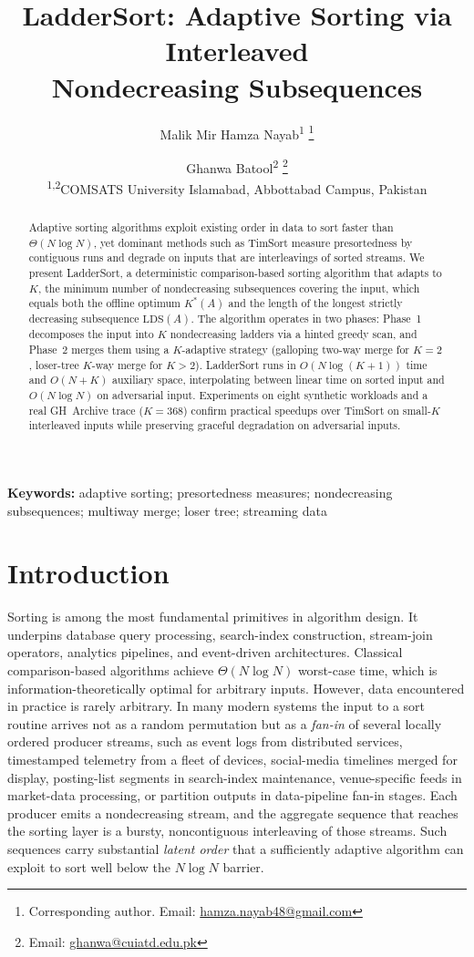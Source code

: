 \documentclass[12pt,a4paper]{article}
\title{LadderSort: Adaptive Sorting via Interleaved\\Nondecreasing Subsequences}
\author{%
  Malik Mir Hamza Nayab\textsuperscript{1}%
  \thanks{Corresponding author. Email:
    \href{mailto:hamza.nayab48@gmail.com}{hamza.nayab48@gmail.com}}
  \and
  Ghanwa Batool\textsuperscript{2}%
  \thanks{Email:
    \href{mailto:ghanwa@cuiatd.edu.pk}{ghanwa@cuiatd.edu.pk}}\\[0.5em]
  \textsuperscript{1,2}COMSATS University Islamabad, Abbottabad Campus, Pakistan
}
\date{}
\theoremstyle{plain}
\theoremstyle{definition}
\begin{document}
\maketitle

\begin{abstract}
Adaptive sorting algorithms exploit existing order in data to sort faster than $\Theta(N \log N)$, yet dominant methods such as TimSort measure presortedness by contiguous runs and degrade on inputs that are interleavings of sorted streams. We present LadderSort, a deterministic comparison-based sorting algorithm that adapts to $K$, the minimum number of nondecreasing subsequences covering the input, which equals both the offline optimum $K^*(A)$ and the length of the longest strictly decreasing subsequence $\mathrm{LDS}(A)$. The algorithm operates in two phases: Phase~1 decomposes the input into $K$ nondecreasing ladders via a hinted greedy scan, and Phase~2 merges them using a $K$-adaptive strategy (galloping two-way merge for $K=2$, loser-tree $K$-way merge for $K>2$). LadderSort runs in $O(N\log(K+1))$ time and $O(N+K)$ auxiliary space, interpolating between linear time on sorted input and $O(N\log N)$ on adversarial input. Experiments on eight synthetic workloads and a real GH~Archive trace ($K=368$) confirm practical speedups over TimSort on small-$K$ interleaved inputs while preserving graceful degradation on adversarial inputs.
\end{abstract}

\noindent\textbf{Keywords:} adaptive sorting; presortedness measures;
nondecreasing subsequences; multiway merge; loser tree; streaming data

\newpage

\section{Introduction}
\label{sec:intro}

Sorting is among the most fundamental primitives in algorithm design.
It underpins database query processing, search-index construction,
stream-join operators, analytics pipelines, and event-driven
architectures.  Classical comparison-based algorithms achieve
$\Theta(N\log N)$ worst-case time, which is information-theoretically
optimal for arbitrary inputs.  However, data encountered in practice is
rarely arbitrary.  In many modern systems the input to a sort routine
arrives not as a random permutation but as a {\em fan-in} of several
locally ordered producer streams, such as event logs from distributed services,
timestamped telemetry from a fleet of devices, social-media timelines
merged for display, posting-list segments in search-index maintenance,
venue-specific feeds in market-data processing, or partition outputs in
data-pipeline fan-in stages.  Each producer emits a nondecreasing stream,
and the aggregate sequence that reaches the sorting layer is a bursty,
noncontiguous interleaving of those streams.  Such sequences carry
substantial \emph{latent order} that a sufficiently adaptive algorithm
can exploit to sort well below the $N\log N$ barrier.
\end{document}
